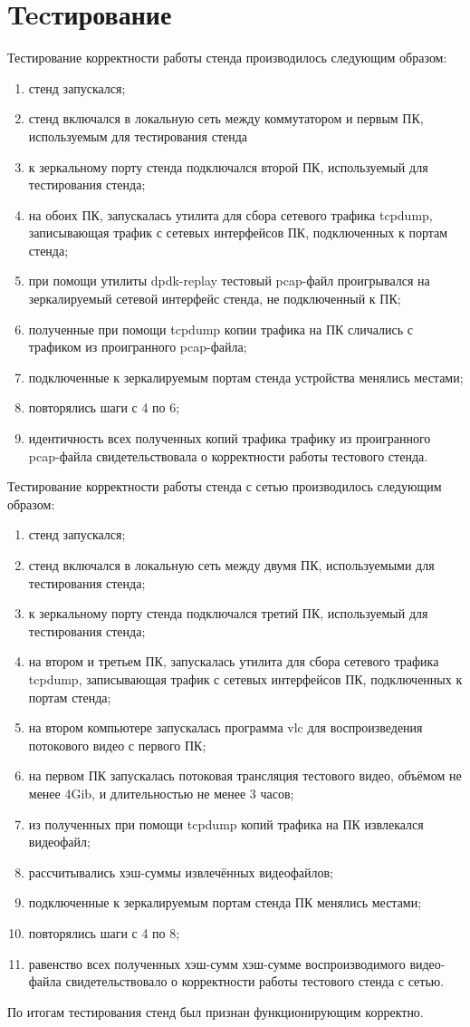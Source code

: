 \section{Tecтирование}

Тестирование корректности работы стенда производилось следующим образом:
\begin{enumerate}
\item стенд запускался;
\item стенд включался в локальную сеть между коммутатором и первым ПК, используемым для тестирования стенда
\item к зеркальному порту стенда подключался второй ПК, используемый для тестирования стенда;
\item на обоих ПК, запускалась утилита для сбора сетевого трафика tcpdump, записывающая трафик с сетевых интерфейсов ПК, подключенных к портам стенда;
\item при помощи утилиты dpdk-replay тестовый pcap-файл проигрывался на зеркалируемый сетевой интерфейс стенда, не подключенный к ПК;
\item полученные при помощи tcpdump копии трафика на ПК сличались с трафиком из проигранного pcap-файла;
\item подключенные к зеркалируемым портам стенда устройства менялись местами;
\item повторялись шаги с 4 по 6;
\item идентичность всех полученных копий трафика трафику из проигранного pcap-файла свидетельствовала о корректности работы тестового стенда.
\end{enumerate}

Тестирование корректности работы стенда с сетью производилось следующим образом:
\begin{enumerate}
\item стенд запускался;
\item стенд включался в локальную сеть между двумя ПК, используемыми для тестирования стенда;
\item к зеркальному порту стенда подключался третий ПК, используемый для тестирования стенда;
\item на втором и третьем  ПК, запускалась утилита для сбора сетевого трафика tcpdump, записывающая трафик с сетевых интерфейсов ПК, подключенных к портам стенда;
\item на втором компьютере запускалась программа vlc для воспроизведения потокового видео с первого ПК;
\item на первом ПК запускалась потоковая трансляция тестового видео, объёмом не менее 4Gib, и длительностью не менее 3 часов;
\item из полученных при помощи tcpdump копий трафика на ПК извлекался видеофайл;
\item рассчитывались хэш-суммы извлечённых видеофайлов;
\item подключенные к зеркалируемым портам стенда ПК менялись местами;
\item повторялись шаги с 4 по 8;
\item равенство всех полученных хэш-сумм хэш-сумме воспроизводимого видео-файла свидетельствовало о корректности работы тестового стенда с сетью.
\end{enumerate}

По итогам тестирования стенд был признан функционирующим корректно.

